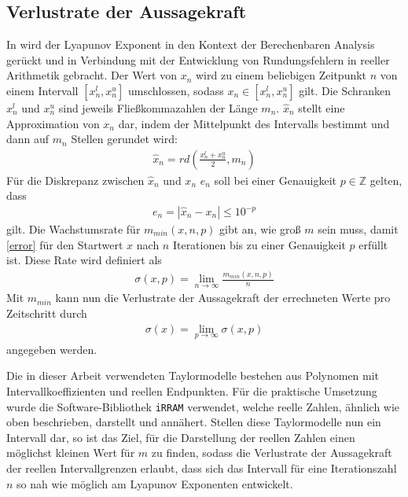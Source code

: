  \subsection{Verlustrate der Aussagekraft}  
 \label{sec:prec}
In \cite{DBLP:spandl} wird der Lyapunov Exponent in den Kontext der Berechenbaren Analysis gerückt und in Verbindung mit der Entwicklung von Rundungsfehlern in reeller Arithmetik gebracht. Der Wert von $x_n$ wird zu einem beliebigen Zeitpunkt $n$ von einem Intervall $[x_n^l,x_n^u]$ umschlossen, sodass $x_n \in [x_n^l,x_n^u]$ gilt. Die Schranken $x_n^l$ und $x_n^u$ sind jeweils Fließkommazahlen der Länge $m_n$. $\hat{x}_n$ stellt eine Approximation von $x_n$ dar, indem der Mittelpunkt des Intervalls bestimmt und dann auf $m_n$ Stellen gerundet wird:
\begin{align}
 \hat{x}_n = rd(\frac{x^l_n + x^u_n}{2}, m_n)
\end{align}
Für die Diskrepanz zwischen $\hat{x}_n$ und $x_n$ $e_n$ soll bei einer Genauigkeit $p \in \mathbb{Z}$ gelten, dass
\begin{align}
\label{error}
 e_n = |\hat{x}_n - x_n| \leq 10^{-p}
\end{align}
gilt. Die Wachstumsrate für $m_{min}(x,n,p)$ gibt an, wie groß $m$ sein muss, damit \ref{error} für den Startwert $x$ nach $n$ Iterationen bis zu einer Genauigkeit $p$ erfüllt ist. Diese Rate wird definiert als
\begin{align}
 \sigma(x,p) = \lim_{n \rightarrow \infty} \frac{m_{min}(x,n,p)}{n}
\end{align}
Mit $m_{min}$ kann nun die Verlustrate der Aussagekraft der errechneten Werte pro Zeitschritt durch  
\begin{align}
 \sigma(x) = \lim_{p \rightarrow \infty} \sigma(x,p)
\end{align}
angegeben werden. 

Die in dieser Arbeit verwendeten Taylormodelle bestehen aus Polynomen mit Intervallkoeffizienten und reellen Endpunkten. Für die praktische Umsetzung wurde die Software-Bibliothek \verb+iRRAM+ \cite{Mller2009EnhancingIE} verwendet, welche reelle Zahlen, ähnlich wie oben beschrieben, darstellt und annähert. Stellen diese Taylormodelle nun ein Intervall dar, so ist das Ziel, für die Darstellung der reellen Zahlen einen möglichst kleinen Wert für $m$ zu finden, sodass die Verlustrate der Aussagekraft der reellen Intervallgrenzen erlaubt, dass sich das Intervall für eine Iterationszahl $n$ so nah wie möglich am Lyapunov Exponenten entwickelt. 

